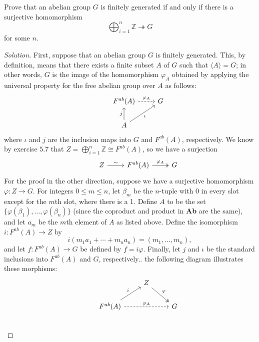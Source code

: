 \documentclass[12pt]{article}
\newenvironment{problem}[2][Problem]{\begin{trivlist}
\item[\hskip \labelsep {\bfseries #1}\hskip \labelsep {\bfseries #2.}]}{\end{trivlist}}
\newcommand{\catname}[1]{\normalfont\textbf{#1}}
\newenvironment{solution}
  {\renewcommand\qedsymbol{$\blacksquare$}\begin{proof}[Solution]}
{\end{proof}}
\begin{document}
\begin{problem}{6.8}
  Prove that an abelian group $G$ is finitely generated if and only if there is a surjective homomorphism
  \begin{equation*}
    \bigoplus_{i=1}^n \mathbb{Z} \twoheadrightarrow G
  \end{equation*}
  for some $n$.
\end{problem}
\begin{solution}
  First, suppose that an abelian group $G$ is finitely generated.
  This, by definition, means that there exists a finite subset $A$ of $G$ such that $\langle A\rangle=G$;
  in other words, $G$ is the image of the homomorphism $\varphi_A$ obtained by applying the universal property
  for the free abelian group over $A$ as follows:
  \[
  \begin{tikzcd}
    & F^{ab}(A) \ar[dashed]{r}{\varphi_A} & G \\
    & A \ar{u}{j} \ar{ur}[swap]{\iota}
  \end{tikzcd} \]
  where $\iota$ and $j$ are the inclusion maps into $G$ and $F^{ab}(A)$, respectively.
  We know by exercise $5.7$ that $Z=\bigoplus_{i=1}^n\mathbb{Z}\cong F^{ab}(A)$, so we have a surjection
  \[\begin{tikzcd}
      & Z \ar{r}{\sim} 
      & F^{ab}(A) \ar[twoheadrightarrow]{r}{\varphi_A} 
      & G
  \end{tikzcd}\]
  For the proof in the other direction, suppose we have a surjective homomorphism \\
  $\varphi : Z \to G$.
  For integers $0 \leq m\leq n$, let $\beta_m$ be the $n$-tuple with 0 in every slot except for the $m$th
  slot, where there is a 1.
  Define $A$ to be the set $\{\varphi(\beta_1),\dots,\varphi(\beta_n)\}$
  (since the coproduct and product in \catname{Ab} are the same), and let $a_m$ be the $m$th element
  of $A$ as listed above. Define the isomorphism $i : F^{ab}(A) \to Z$ by
  \begin{equation*}
    i(m_1a_1 + \cdots + m_na_n) = (m_1,\dots,m_n),
  \end{equation*}
  and let $f : F^{ab}(A) \to G$ be defined by $f = i\varphi$.
  Finally, let $j$ and $\iota$ be the standard inclusions into $F^{ab}(A)$ and $G$, respectively..
  the following diagram illustrates these morphisms:
  \[\begin{tikzcd}
      & & Z \ar[two heads]{dr}{\varphi} \\
      & F^{ab}(A) \ar{ur}{i} \ar[dashed]{rr}{\varphi_A} && G\\

\end{tikzcd}\]
\end{solution}
\end{document}
